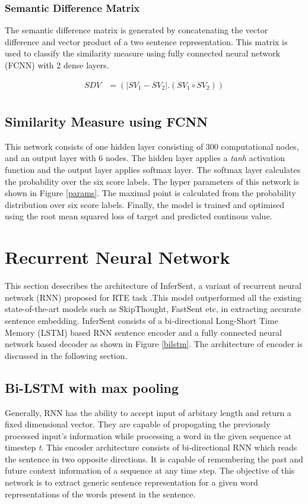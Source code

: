 \documentclass[12pt]{report} %
\begin{document}
	
	\subsubsection*{Semantic Difference Matrix}
	The semantic difference matrix is generated by concatenating the vector difference and vector product of a two sentence representation. This matrix is used to classify the similarity measure using fully connected neural network (FCNN) with 2 dense layers. 
	
		\begin{align*} 
			SDV & =(|SV_{1}- SV_{2}|.(SV_{1} \circ SV_{2})) \\
		\end{align*}
	
	\subsection{Similarity Measure using FCNN}
	
	 This network consists of one hidden layer consisting of 300 computational nodes, and an output layer with 6 nodes. The hidden layer applies a \textit{tanh} activation function and the output layer applies softmax layer. The softmax layer calculates the probability over the six score labels. The hyper parameters of this network is shown in Figure \ref{params}.
	 The maximal point is calculated from the probability distribution over six score labels. Finally, the model is trained and optimised using the root mean squared loss of target and predicted continous value. 
	 
	 \section{Recurrent Neural Network}
	 This section desecribes the architecture of InferSent, a variant of recurrent neural network (RNN) proposed for RTE task \citep{conneau2017supervised}.This model outperformed all the existing state-of-the-art models such as SkipThought, FastSent etc, in extracting accurate sentence embedding. InferSent consists of a bi-directional Long-Short Time Memory (LSTM) based RNN sentence encoder and a fully connected neural network based decoder as shown in Figure \ref{bilstm}. The architecture of encoder is discussed in the following section. 
	 
	\subsection{Bi-LSTM with max pooling}
	Generally, RNN has the ability to accept input of arbitary length and return a fixed dimensional vector. They are capable of propogating the previously processed input's information while processing a word in the given sequence at timestep \textit{t}.
	This encoder architecture consists of bi-directional RNN which reads the sentence in two opposite directions. It is capable of remembering the past and future context information of a sequence at any time step. The objective of this network is to extract generic sentence representation for a given word representations of the words present in the sentence.  
	
\end{document}
